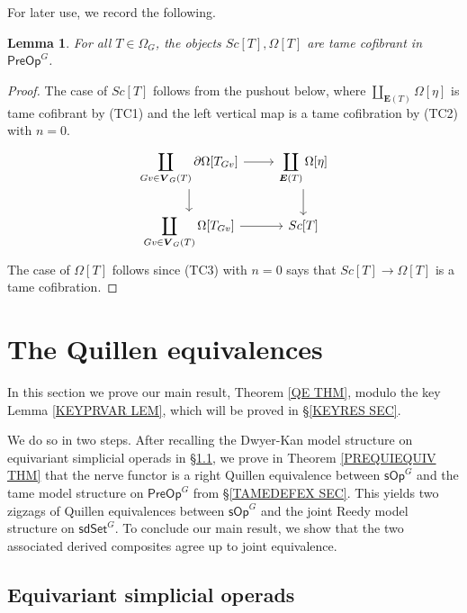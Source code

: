 \documentclass[a4paper,10pt
,draft
]{article}%
\numberwithin{equation}{section}
\numberwithin{figure}{section}
\newtheorem{lemma}[equation]{Lemma}%
\theoremstyle{definition} %
\newcommand{\sOp}{\ensuremath{\mathsf{sOp}}}%
\newcommand{\sdSet}{\mathsf{sdSet}}
\newcommand{\PreOp}{\mathsf{PreOp}}
\newcommand{\1}{\ensuremath{\mathbbm 1}}%
\begin{document}
For later use, we record the following.

\begin{lemma}\label{OMEGATTAME_LEM}
	For all $T \in \Omega_G$, the objects $Sc[T],\Omega[T]$ are tame cofibrant in $\mathsf{PreOp}^G$.
\end{lemma}

\begin{proof}
	The case of $Sc[T]$ follows from the pushout below, 
	where $\coprod_{\boldsymbol{E}(T)}\Omega[\eta]$
	is tame cofibrant by (TC1) and the left vertical map is 
	a tame cofibration by (TC2) with $n=0$.
	\[
	\begin{tikzcd}
	\displaystyle{
		\coprod_{Gv \in \boldsymbol{V}_G(T)} \partial\Omega[T_{Gv}]
	}
	\arrow[d] \arrow[r]
	&
	\displaystyle{
		\coprod_{\boldsymbol{E}(T)} \Omega[\eta]
	}
	\arrow[d]
	\\
	\displaystyle{
		\coprod_{Gv \in \boldsymbol{V}_G(T)} \Omega[T_{Gv}]
	}
	\arrow[r]
	&
	Sc[T]
	\end{tikzcd}
	\]
	The case of $\Omega[T]$
	follows since (TC3) with $n=0$
	says that $Sc[T] \to \Omega[T]$ is a tame cofibration.
\end{proof}





\section{The Quillen equivalences}
\label{QE_SEC}


In this section we prove our main result, Theorem \ref{QE THM},
modulo the key Lemma \ref{KEYPRVAR LEM}, 
which will be proved in \S \ref{KEYRES SEC}.


We do so in two steps.
After recalling the Dwyer-Kan model structure on equivariant simplicial operads in \S \ref{GSOP_SEC},
we prove in Theorem \ref{PREQUIEQUIV THM} that the nerve functor is a right Quillen equivalence 
between $\mathsf{sOp}^G$ and  
the tame model structure on $\PreOp^G$ from \S \ref{TAMEDEFEX SEC}.
This yields two zigzags of Quillen equivalences between $\sOp^G$ and the joint Reedy model structure on $\sdSet^G$.
To conclude our main result, we show that the two associated derived composites agree up to joint equivalence.




\subsection{Equivariant simplicial operads}
\label{GSOP_SEC}
\end{document}
